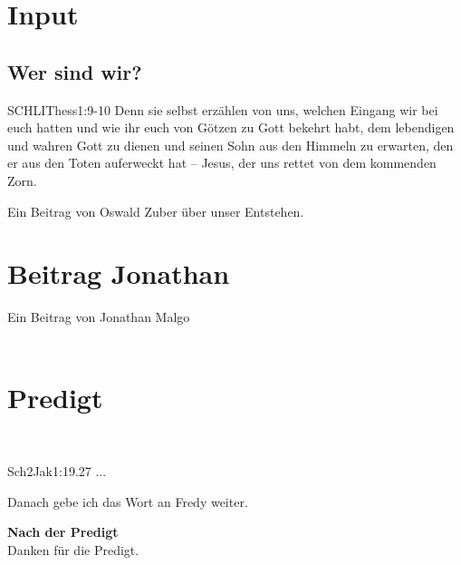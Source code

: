 
\section{ Input }
\begin{spacing}{1.5}
\subsection{Wer sind wir?}
\begin{bibelbox}{SCHL}{IThess}{1:9-10}
Denn sie selbst erzählen von uns, welchen Eingang wir bei euch hatten und wie ihr euch von Götzen zu Gott bekehrt habt, dem lebendigen und wahren Gott zu dienen und seinen Sohn aus den Himmeln zu erwarten, den er aus den Toten auferweckt hat -- Jesus, der uns rettet von dem kommenden Zorn.
\end{bibelbox}

Ein Beitrag von Oswald Zuber über unser Entstehen.
\end{spacing}


\section{Beitrag Jonathan}
Ein Beitrag von Jonathan Malgo\\

\\

\section{Predigt}
\\
\begin{bibeltext}{Sch2}{Jak}{1:19.27}
...
\end{bibeltext}
Danach gebe ich das Wort an Fredy weiter.

\textbf{Nach der Predigt}\\

Danken für die Predigt.\\

\\


